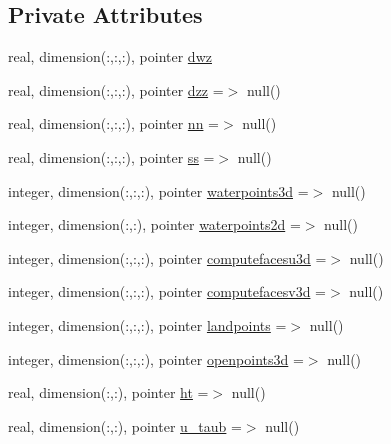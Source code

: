 \subsection*{Private Attributes}
\begin{DoxyCompactItemize}
\item 
real, dimension(\+:,\+:,\+:), pointer \mbox{\hyperlink{structmoduleturbgotm_1_1t__external_a9dee0a08c64abcc2f413d40f4e3c7559}{dwz}}
\item 
real, dimension(\+:,\+:,\+:), pointer \mbox{\hyperlink{structmoduleturbgotm_1_1t__external_a6db02bf449437f5a91890fea4cbe8e50}{dzz}} =$>$ null()
\item 
real, dimension(\+:,\+:,\+:), pointer \mbox{\hyperlink{structmoduleturbgotm_1_1t__external_a2c27c608e95449cf1089824b4ecafb5c}{nn}} =$>$ null()
\item 
real, dimension(\+:,\+:,\+:), pointer \mbox{\hyperlink{structmoduleturbgotm_1_1t__external_a7901e0337aacb344b45fac31bd0147cf}{ss}} =$>$ null()
\item 
integer, dimension(\+:,\+:,\+:), pointer \mbox{\hyperlink{structmoduleturbgotm_1_1t__external_a934d50adcf96e3156c0c953414123cdc}{waterpoints3d}} =$>$ null()
\item 
integer, dimension(\+:,\+:), pointer \mbox{\hyperlink{structmoduleturbgotm_1_1t__external_a702d427d75a237ef00b57ea3bd0296ad}{waterpoints2d}} =$>$ null()
\item 
integer, dimension(\+:,\+:,\+:), pointer \mbox{\hyperlink{structmoduleturbgotm_1_1t__external_a16d59f2055c15f5b760ba6c63f540814}{computefacesu3d}} =$>$ null()
\item 
integer, dimension(\+:,\+:,\+:), pointer \mbox{\hyperlink{structmoduleturbgotm_1_1t__external_abcdd67bee274dea45d52e7c1495d56fd}{computefacesv3d}} =$>$ null()
\item 
integer, dimension(\+:,\+:,\+:), pointer \mbox{\hyperlink{structmoduleturbgotm_1_1t__external_a3ac761a41d820b5988f004c2bfabca0c}{landpoints}} =$>$ null()
\item 
integer, dimension(\+:,\+:,\+:), pointer \mbox{\hyperlink{structmoduleturbgotm_1_1t__external_af768e4c09c3b458ecca93dcfe4b7f9ca}{openpoints3d}} =$>$ null()
\item 
real, dimension(\+:,\+:), pointer \mbox{\hyperlink{structmoduleturbgotm_1_1t__external_aafe513ff95ed79ae35754f97610cf19a}{ht}} =$>$ null()
\item 
real, dimension(\+:,\+:), pointer \mbox{\hyperlink{structmoduleturbgotm_1_1t__external_a01dcadf6620f8976ac6f1c016bed5a8c}{u\+\_\+taub}} =$>$ null()

\end{DoxyCompactItemize}
